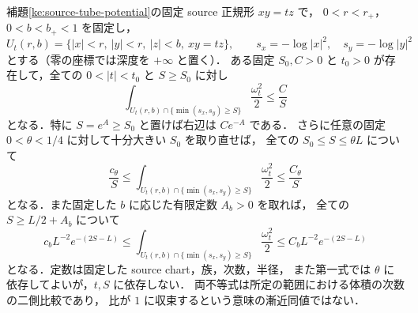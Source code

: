 \begin{proposition}
\label{ke:source-uniform-deep-volume-tail}
補題\ref{ke:source-tube-potential}の固定 source 正規形 $xy=tz$ で，
$0<r<r_+$，$0<b<b_+<1$ を固定し，
\[
 U_t(r,b)=\{|x|<r,\ |y|<r,\ |z|<b,\ xy=tz\},\qquad
 s_x=-\log|x|^2,\quad s_y=-\log|y|^2
\]
とする（零の座標では深度を $+\infty$ と置く）．
ある固定 $S_0,C>0$ と $t_0>0$ が存在して，全ての
$0<|t|<t_0$ と $S\ge S_0$ に対し
\begin{equation}\label{ke:eq:source-uniform-deep-volume-tail}
 \int_{U_t(r,b)\cap\{\min(s_x,s_y)\ge S\}}
       \frac{\omega_t^2}{2}\le\frac C S
\end{equation}
となる．特に $S=e^A\ge S_0$ と置けば右辺は $Ce^{-A}$ である．
さらに任意の固定 $0<\theta<1/4$ に対して十分大きい $S_0$ を取り直せば，
全ての $S_0\le S\le\theta L$ について
\begin{equation}\label{ke:eq:source-arm-volume-sharp}
 \frac{c_\theta}{S}\le
 \int_{U_t(r,b)\cap\{\min(s_x,s_y)\ge S\}}
       \frac{\omega_t^2}{2}
 \le\frac{C_\theta}{S}
\end{equation}
となる．また固定した $b$ に応じた有限定数 $A_b>0$ を取れば，
全ての $S\ge L/2+A_b$ について
\begin{equation}\label{ke:eq:source-central-exponential-volume}
 c_b L^{-2}e^{-(2S-L)}\le
 \int_{U_t(r,b)\cap\{\min(s_x,s_y)\ge S\}}
       \frac{\omega_t^2}{2}
 \le C_b L^{-2}e^{-(2S-L)}
\end{equation}
となる．定数は固定した source chart，族，次数，半径，
また第一式では $\theta$ に依存してよいが，$t,S$ に依存しない．
両不等式は所定の範囲における体積の次数の二側比較であり，
比が $1$ に収束するという意味の漸近同値ではない．
\end{proposition}

